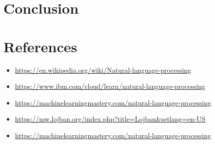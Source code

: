 \documentclass[11pt]{article}
\begin{document}
\clearpage









\section{Conclusion}
\label{sec:org15da519}

\section{References}
\label{sec:org53dbba1}
\begin{itemize}
\item \url{https://en.wikipedia.org/wiki/Natural-language-processing}
\item \url{https://www.ibm.com/cloud/learn/natural-language-processing}
\item \url{https://machinelearningmastery.com/natural-language-processing}
\item \url{https://mw.lojban.org/index.php?title=Lojban\&setlang=en-US}
\item \url{https://machinelearningmastery.com/natural-language-processing}
\end{itemize}
\end{document}
